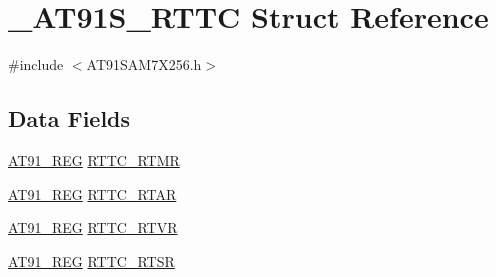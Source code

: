 \hypertarget{struct__AT91S__RTTC}{\section{\-\_\-\-A\-T91\-S\-\_\-\-R\-T\-T\-C Struct Reference}
\label{struct__AT91S__RTTC}
}


{\ttfamily \#include $<$A\-T91\-S\-A\-M7\-X256.\-h$>$}

\subsection*{Data Fields}
\begin{DoxyCompactItemize}
\item 
\hyperlink{GCC_2ARM7__AT91SAM7S_2AT91SAM7X256_8h_a712ad5a1ac1bd02f3e95a7526c283ce1}{A\-T91\-\_\-\-R\-E\-G} \hyperlink{struct__AT91S__RTTC_af7214be994c52cf0ae55e15e2ab9c9e2}{R\-T\-T\-C\-\_\-\-R\-T\-M\-R}
\item 
\hyperlink{GCC_2ARM7__AT91SAM7S_2AT91SAM7X256_8h_a712ad5a1ac1bd02f3e95a7526c283ce1}{A\-T91\-\_\-\-R\-E\-G} \hyperlink{struct__AT91S__RTTC_ae75f833e12a6db82f882777c08a20870}{R\-T\-T\-C\-\_\-\-R\-T\-A\-R}
\item 
\hyperlink{GCC_2ARM7__AT91SAM7S_2AT91SAM7X256_8h_a712ad5a1ac1bd02f3e95a7526c283ce1}{A\-T91\-\_\-\-R\-E\-G} \hyperlink{struct__AT91S__RTTC_a6939d12b84e3913d9d8bfeee281ea08f}{R\-T\-T\-C\-\_\-\-R\-T\-V\-R}
\item 
\hyperlink{GCC_2ARM7__AT91SAM7S_2AT91SAM7X256_8h_a712ad5a1ac1bd02f3e95a7526c283ce1}{A\-T91\-\_\-\-R\-E\-G} \hyperlink{struct__AT91S__RTTC_a482110506eb725a2c144619e0bb0547d}{R\-T\-T\-C\-\_\-\-R\-T\-S\-R}
\end{DoxyCompactItemize}


